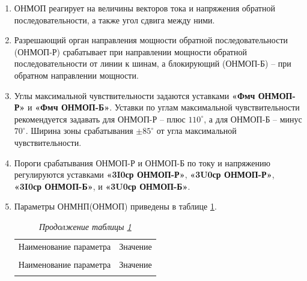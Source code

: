 \begin{enumerate}
\begin{enumerate}
\item
ОНМОП реагирует на величины векторов тока и напряжения обратной последовательности, а также угол сдвига между ними.

\item
Разрешающий орган направления мощности обратной последовательности (ОНМОП-Р) срабатывает при направлении мощности обратной последовательности от линии к шинам, а блокирующий (ОНМОП-Б) -- при обратном направлении мощности. 

\item
Углы максимальной чувствительности задаются уставками \textbf{«Фмч ОНМОП-Р»} и \textbf{«Фмч ОНМОП-Б»}. Уставки по углам максимальной чувствительности рекомендуется задавать для ОНМОП-Р -- плюс $110^\circ$, а для ОНМОП-Б -- минус $70^\circ$. Ширина зоны срабатывания $\pm 85^\circ$ от угла максимальной чувствительности.

\item
Пороги срабатывания ОНМОП-Р и ОНМОП-Б по току и напряжению регулируются уставками \textbf{«3I0ср ОНМОП-Р»}, \textbf{«3U0ср ОНМОП-Р»}, \textbf{«3I0ср ОНМОП-Б»}, и \textbf{«3U0ср ОНМОП-Б»}.

\item
Параметры ОНМНП(ОНМОП) приведены в таблице \ref{desc_tnznp:tbl2}.

\small
\setlength{\extrarowheight}{0.05cm} %
\begin{longtable}
{|>{\centering\arraybackslash}m{15.2cm}|>{\centering\arraybackslash}m{1.7cm}|}
\caption{Параметры ОНМНП(ОНМОП)\hfill\vspace{-0.5\baselineskip}}\label{desc_tnznp:tbl2}\\ 
\hhline{|-|-|}
\rowcolor{gray!30}
Наименование параметра & Значение  \\ 
\hhline{|-|-|}
\endfirsthead

\caption*{\hspace{3pt}\emph{Продолжение таблицы \ref{desc_tnznp:tbl2}\hfill\vspace{-0.5\baselineskip}}} \\ %
\hhline{|-|-|}
\rowcolor{gray!30}
Наименование параметра & Значение  \\ 
\hhline{|-|-|}
\endhead
\hhline{|-|-|}

\endfoot
\endlastfoot


\end{longtable}
\end{enumerate}
\end{enumerate}
